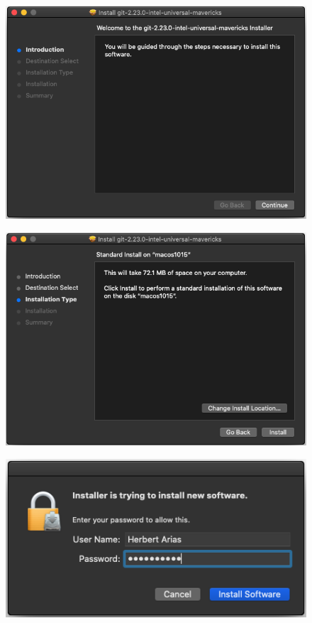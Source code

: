 \documentclass{article}
\begin{document}
\newpage

\begin{figure}[h!]
  \centering
  \includegraphics[scale=0.5]{./Pictures/029_mac_git.png}
\end{figure}

\begin{figure}[h!]
  \centering
  \includegraphics[scale=0.5]{./Pictures/030_mac_git.png}
\end{figure}

\begin{figure}[h!]
  \centering
  \includegraphics[scale=0.5]{./Pictures/031_mac_git.png}
\end{figure}
\end{document}
